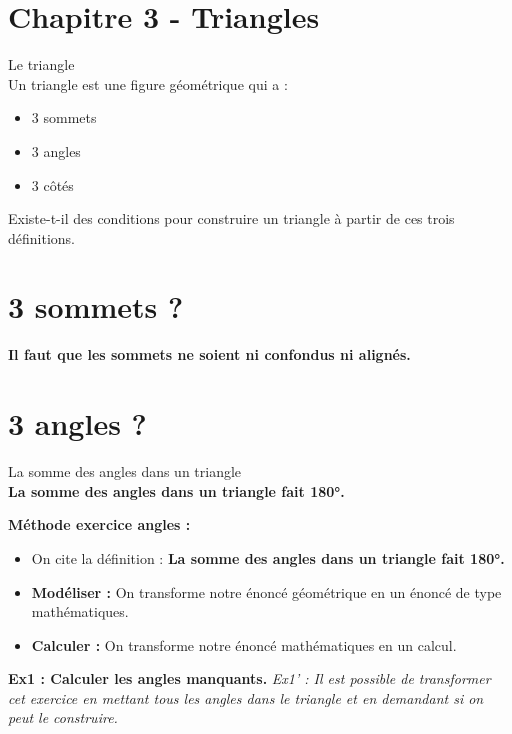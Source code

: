 



\horrule{2px}
\section*{Chapitre 3 - Triangles}
\horrule{2px}

\begin{Definition}{Le triangle}\\
  Un triangle est une figure géométrique qui a : 
  \begin{itemize}
    \item 3 sommets
    \item 3 angles
    \item 3 côtés
  \end{itemize}
\end{Definition}

Existe-t-il des conditions pour construire un triangle à partir de ces trois définitions.

\section*{3 sommets ?}

\textbf{Il faut que les sommets ne soient ni confondus ni alignés.}

\section*{3 angles ?}

\begin{Definition}{La somme des angles dans un triangle}\\
  \textbf{La somme des angles dans un triangle fait 180°.}
\end{Definition}


\textbf{Méthode exercice angles :}

\begin{itemize}
  \item On cite la définition : \textbf{La somme des angles dans un triangle fait 180°.}
  \item \textbf{Modéliser : } On transforme notre énoncé géométrique en un énoncé de type mathématiques.
  \item \textbf{Calculer : } On transforme notre énoncé mathématiques en un calcul. 
\end{itemize}

\horrule{1px}
\textbf{Ex1 : Calculer les angles manquants.}
\textit{Ex1' : Il est possible de transformer cet exercice en mettant tous les angles dans le triangle et en demandant si on peut le construire.}

